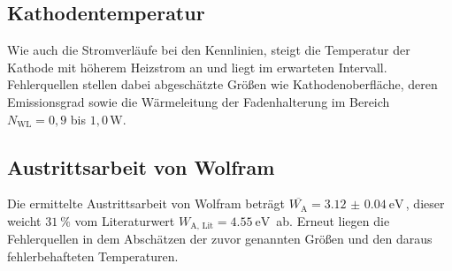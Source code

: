\subsection{Kathodentemperatur}
Wie auch die Stromverläufe bei den Kennlinien, steigt die Temperatur der Kathode mit höherem Heizstrom an und liegt im erwarteten Intervall.
Fehlerquellen stellen dabei abgeschätzte Größen wie Kathodenoberfläche, 
deren Emissionsgrad sowie die Wärmeleitung der Fadenhalterung im Bereich $N_{\text{WL}} = 0,9$ bis $1,0 \, \mathrm{W}$.

\subsection{Austrittsarbeit von Wolfram}
Die ermittelte Austrittsarbeit von Wolfram beträgt $\overline{W_{\text{A}}} = \qty{3.12(4)}{\eV} \,$, 
dieser weicht $\qty{31}{\percent}$ vom Literaturwert $W_{\text{A, Lit}} = \qty{4.55}{\eV} \,$ \cite[14]{austrittsarbeit} ab.
Erneut liegen die Fehlerquellen in dem Abschätzen der zuvor genannten Größen und den daraus fehlerbehafteten Temperaturen.